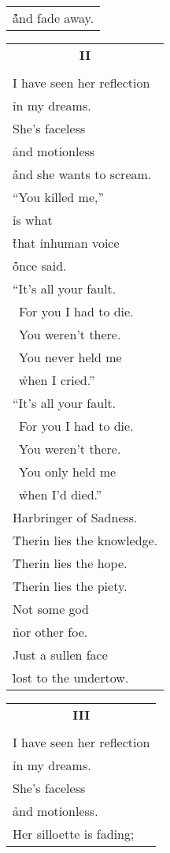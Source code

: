\documentclass{article}
\begin{document}
\begin{center}
\begin{tabular}{l}
\h\h\h\h\h and fade away. \\
\end{tabular}
\begin{tabular}{l}
\multicolumn{1}{c}{\large\textbf{II}} \\
\\
I have seen her reflection \\
\h in my dreams. \\
She's faceless \\
\h and motionless \\
\h\h and she wants to scream. \\ %
``You killed me,'' \\
\h is what \\
\h\h that inhuman voice \\
\h\h\h once said. \\
``It's all your fault. \\
\ For you I had to die. \\
\ You weren't there. \\
\ You never held me \\
\ \h when I cried.'' \\
``It's all your fault. \\
\ For you I had to die. \\
\ You weren't there. \\
\ You only held me \\
\ \h when I'd died.'' \\
Harbringer of Sadness. \\
\h Therin lies the knowledge. \\
\h Therin lies the hope. \\
\h Therin lies the piety. \\
Not some god \\
\h nor other foe. \\ %
Just a sullen face \\
\h lost to the undertow. \\
\end{tabular}
\begin{tabular}{l}
\multicolumn{1}{c}{\large\textbf{III}} \\
\\
I have seen her reflection \\
\h in my dreams. \\
She's faceless \\
\h and motionless. \\
Her silloette is fading; \\

\end{tabular}
\end{center}
\end{document}

